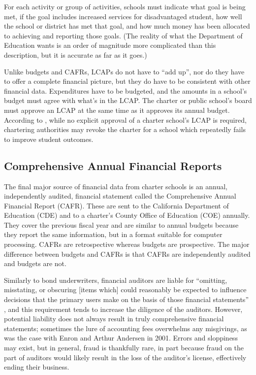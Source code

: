 For each activity or group of activities, schools must indicate what goal is being met, if the goal includes increased services for disadvantaged student, how well the school or district has met that goal, and how much money has been allocated to achieving and reporting those goals. (The reality of what the Department of Education wants is an order of magnitude more complicated than this description, but it is accurate as far as it goes.)

Unlike budgets and CAFRs, LCAPs do not have to ``add up'', nor do they have to offer a complete financial picture, but they do have to be consistent with other financial data. Expenditures have to be budgeted, and the amounts in a school's budget must agree with what's in the LCAP\@. The charter or public school's board must approve an LCAP at the same time as it approves its annual budget. According to \textcite[81]{Aguinaldo.etal2022}, while no explicit approval of a charter school's LCAP is required, chartering authorities may revoke the charter for a school which repeatedly fails to improve student outcomes.

\subsection{Comprehensive Annual Financial Reports}\label{sec:CAFRs}\indent%

The final major source of financial data from charter schools is an annual, independently audited, financial statement called the Comprehensive Annual Financial Report (CAFR). These are sent to the California Department of Education (CDE) and to a charter's County Office of Education (COE) annually. They cover the previous fiscal year and are similar to annual budgets because they report the same information, but in a format suitable for computer processing. CAFRs are retrospective whereas budgets are prospective. The major difference between budgets and CAFRs is that CAFRs are independently audited and budgets are not. 

Similarly to bond underwriters, financial auditors are liable for ``omitting, misstating, or obscuring [items which] could reasonably be expected to influence decisions that the primary users make on the basis of those financial statements'' \parencite{Cayamanda2020}, and this requirement tends to increase the diligence of the auditors. However, potential liability does not always result in truly comprehensive financial statements; sometimes the lure of accounting fees overwhelms any misgivings, as was the case with Enron and Arthur Andersen in 2001. Errors and sloppiness may exist, but in general, fraud is thankfully rare, in part because fraud on the part of auditors would likely result in the loss of the auditor's license, effectively ending their business. 

